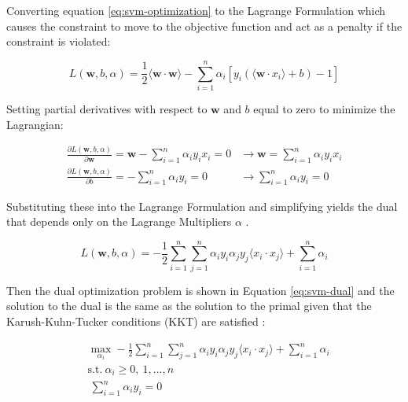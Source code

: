 Converting equation \ref{eq:svm-optimization} to the Lagrange Formulation which causes the constraint to move to the objective function and act as a penalty if the constraint is violated:

\begin{equation}
    L(\mathbf{w}, b, \alpha) = \frac{1}{2} \langle \mathbf{w} \cdot \mathbf{w} \rangle - \sum^n_{i=1}{\alpha_i[y_i(\langle \mathbf{w} \cdot x_i \rangle + b) - 1]}
\end{equation}

Setting partial derivatives with respect to $\mathbf{w}$ and $b$ equal to zero to minimize the Lagrangian:

\begin{equation}
    \label{eq:lagrangian-partial-deriv}
    \begin{split}
        \frac{\partial L(\mathbf{w}, b, \alpha)}{\partial \mathbf{w}} = \mathbf{w} - \sum^n_{i=1}{\alpha_i y_i x_i} = 0 & \rightarrow \mathbf{w} = \sum^n_{i=1}{\alpha_i y_i x_i} \\
        \frac{\partial L(\mathbf{w}, b, \alpha)}{\partial b} = - \sum^n_{i=1}{\alpha_i y_i} = 0 & \rightarrow \sum^n_{i=1}{\alpha_i y_i} = 0
    \end{split}
\end{equation}

Substituting these into the Lagrange Formulation and simplifying yields the dual that depends only on the Lagrange Multipliers $\alpha$ \cite{cervantesComprehensiveSurveySupport2020}.

\begin{equation}
    L(\mathbf{w}, b, \alpha) = - \frac{1}{2} \sum_{i=1}^n{\sum_{j=1}^n{\alpha_i y_i \alpha_j y_j \langle x_i \cdot x_j \rangle}} + \sum_{i=1}^n{\alpha_i}
\end{equation}

Then the dual optimization problem is shown in Equation \ref{eq:svm-dual} and the solution to the dual is the same as the solution to the primal given that the Karush-Kuhn-Tucker conditions (KKT) are satisfied \cite{cervantesComprehensiveSurveySupport2020}:

\begin{equation}
    \label{eq:svm-dual}
    \begin{split}
        & \max_{\alpha_i} - \frac{1}{2} \sum_{i=1}^n{\sum_{j=1}^n{\alpha_i y_i \alpha_j y_j \langle x_i \cdot x_j \rangle}} + \sum_{i=1}^n{\alpha_i} \\
        & \text{s.t.} \: \alpha_i \ge 0, \: 1, ..., n \\
        & \: \sum^n_{i=1}{\alpha_i y_i} = 0
    \end{split}
\end{equation}

